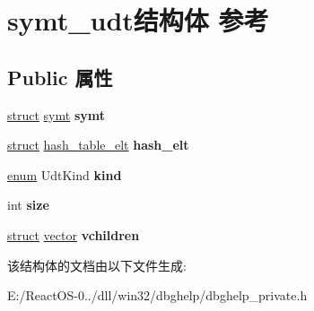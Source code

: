 \hypertarget{structsymt__udt}{}\section{symt\+\_\+udt结构体 参考}
\label{structsymt__udt}
\subsection*{Public 属性}
\begin{DoxyCompactItemize}
\item 
\mbox{\label{structsymt__udt_a40da8ad0eddac6f5905cfe9b14db1f27}} 
\hyperlink{interfacestruct}{struct} \hyperlink{structsymt}{symt} {\bfseries symt}
\item 
\mbox{\label{structsymt__udt_adb53408ac6dddbba6f19df64bdd51121}} 
\hyperlink{interfacestruct}{struct} \hyperlink{structhash__table__elt}{hash\+\_\+table\+\_\+elt} {\bfseries hash\+\_\+elt}
\item 
\mbox{\label{structsymt__udt_ab297380122259bbd39c18305a1661060}} 
\hyperlink{interfaceenum}{enum} Udt\+Kind {\bfseries kind}
\item 
\mbox{\label{structsymt__udt_a420c4d0963e94a35baa5c00886f72e5f}} 
int {\bfseries size}
\item 
\mbox{\label{structsymt__udt_a39fd41bf4ba4ab2a6ead94d55be84158}} 
\hyperlink{interfacestruct}{struct} \hyperlink{structvector}{vector} {\bfseries vchildren}
\end{DoxyCompactItemize}


该结构体的文档由以下文件生成\+:\begin{DoxyCompactItemize}
\item 
E\+:/\+React\+O\+S-\/0../dll/win32/dbghelp/dbghelp\+\_\+private.\+h\end{DoxyCompactItemize}
